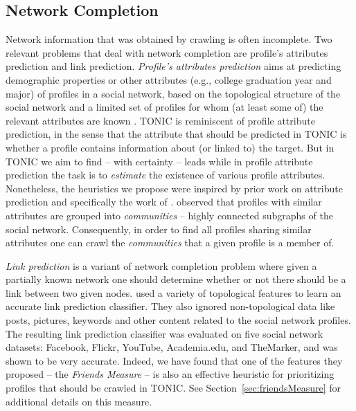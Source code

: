 \documentclass[prodmode,acmtecs]{acmsmall} %
\begin{document}
\subsection{Network Completion}
Network information that was obtained by crawling is often incomplete. 
Two relevant problems that deal with network completion are profile's attributes prediction and link prediction.  
{\em Profile's attributes prediction} aims at predicting demographic properties or other attributes (e.g., college graduation year and major) of profiles in a social network, based on the topological structure of the social network and a limited set of profiles for whom (at least some of) the relevant attributes are known \cite{fire2011linkPrediction,mislove2010youAreWho,altshuler2011incremental}. 
TONIC is reminiscent of profile attribute prediction, in the sense that the attribute that should be predicted in TONIC is whether a profile contains information about (or linked to) the target. But in TONIC we aim to find -- with certainty -- leads while in profile attribute prediction the task is to {\em estimate} the existence of various profile attributes. Nonetheless, the heuristics we propose were inspired by prior work on attribute prediction and specifically the work of 
.  observed that profiles with similar attributes are grouped into {\em communities} -- highly connected subgraphs of the social network. 
Consequently, in order to find all profiles sharing similar attributes one can crawl the {\em communities} that a given profile is a member of. 



{\em Link prediction} is a variant of network completion problem where given a partially known network one should determine whether or not there should be a link between two given nodes.  
 used
a variety of topological features to learn an accurate link prediction classifier. They also ignored non-topological data like posts, pictures, keywords and other content related to the social network profiles. The resulting link prediction classifier was evaluated 
on five social network datasets: Facebook, Flickr, YouTube, Academia.edu, and TheMarker, and was shown to be very accurate. 
Indeed, we have found that one of the features they proposed --  the \emph{Friends Measure} -- is also an effective heuristic for  prioritizing profiles that should be crawled in TONIC. See Section~\ref{sec:friendsMeasure} for additional details on this measure.  
\end{document}
